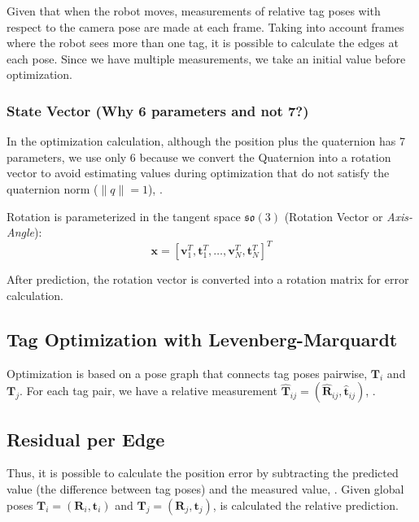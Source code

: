 Given that when the robot moves, measurements of relative tag poses with respect to the camera pose are made at each frame. Taking into account frames where the robot sees more than one tag, it is possible to calculate the edges at each pose. Since we have multiple measurements, we take an initial value before optimization.

\subsubsection{State Vector (Why 6 parameters and not 7?)}

In the optimization calculation, although the position plus the quaternion has 7 parameters, we use only 6 because we convert the Quaternion into a rotation vector to avoid estimating values during optimization that do not satisfy the quaternion norm ($\|q\|=1$), \cite{barfoot2024state}.

Rotation is parameterized in the tangent space $\mathfrak{so}(3)$ (Rotation Vector or \textit{Axis-Angle}):
\begin{equation}
    \mathbf{x} = [\mathbf{v}_1^T, \mathbf{t}_1^T, \dots, \mathbf{v}_N^T, \mathbf{t}_N^T]^T
\end{equation}

After prediction, the rotation vector is converted into a rotation matrix for error calculation.

\subsection{Tag Optimization with Levenberg-Marquardt}

Optimization is based on a pose graph that connects tag poses pairwise, $\mathbf{T}_i$ and $\mathbf{T}_j$. For each tag pair, we have a relative measurement $\hat{\mathbf{T}}_{ij} = (\hat{\mathbf{R}}_{ij}, \hat{\mathbf{t}}_{ij})$, \cite{barfoot2024state}.

\subsection{Residual per Edge}

Thus, it is possible to calculate the position error by subtracting the predicted value (the difference between tag poses) and the measured value, \cite{barfoot2024state}.
Given global poses $\mathbf{T}_i = (\mathbf{R}_i, \mathbf{t}_i)$ and $\mathbf{T}_j = (\mathbf{R}_j, \mathbf{t}_j)$, is calculated the relative prediction.

